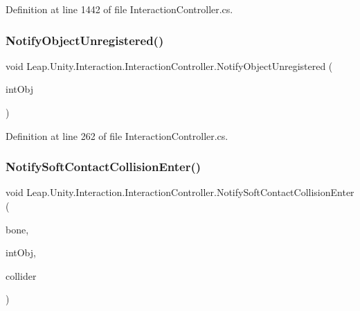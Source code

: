 Definition at line 1442 of file Interaction\+Controller.\+cs.

\mbox{\label{class_leap_1_1_unity_1_1_interaction_1_1_interaction_controller_a6872fdce5368a5c4eb91f0fc1f0b8930}} 
\subsubsection{\texorpdfstring{NotifyObjectUnregistered()}{NotifyObjectUnregistered()}}
{\footnotesize\ttfamily void Leap.\+Unity.\+Interaction.\+Interaction\+Controller.\+Notify\+Object\+Unregistered (\begin{DoxyParamCaption}\item[{\mbox{\hyperlink{interface_leap_1_1_unity_1_1_interaction_1_1_i_interaction_behaviour}{I\+Interaction\+Behaviour}}}]{int\+Obj }\end{DoxyParamCaption})}



Definition at line 262 of file Interaction\+Controller.\+cs.

\mbox{\label{class_leap_1_1_unity_1_1_interaction_1_1_interaction_controller_a85e7d1ae481b963c1b002b3ad447679a}} 
\subsubsection{\texorpdfstring{NotifySoftContactCollisionEnter()}{NotifySoftContactCollisionEnter()}}
{\footnotesize\ttfamily void Leap.\+Unity.\+Interaction.\+Interaction\+Controller.\+Notify\+Soft\+Contact\+Collision\+Enter (\begin{DoxyParamCaption}\item[{\mbox{\hyperlink{class_leap_1_1_unity_1_1_interaction_1_1_contact_bone}{Contact\+Bone}}}]{bone,  }\item[{\mbox{\hyperlink{interface_leap_1_1_unity_1_1_interaction_1_1_i_interaction_behaviour}{I\+Interaction\+Behaviour}}}]{int\+Obj,  }\item[{Collider}]{collider }\end{DoxyParamCaption})}



